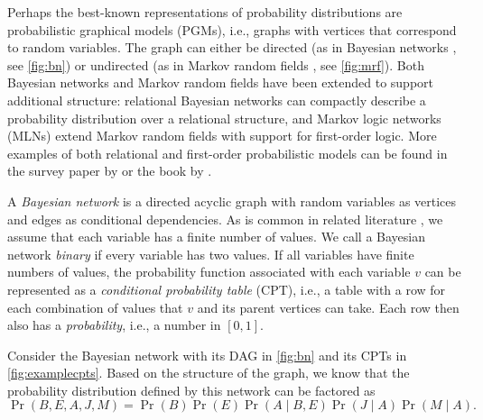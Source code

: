 Perhaps the best-known representations of probability distributions are
probabilistic graphical models (PGMs), i.e., graphs with vertices that
correspond to random variables. The graph can either be directed (as in Bayesian
networks \citep{DBLP:books/daglib/0066829}, see \cref{fig:bn}) or undirected (as
in Markov random fields \citep{spitzer1971markov}, see \cref{fig:mrf}). Both
Bayesian networks and Markov random fields have been extended to support
additional structure: relational Bayesian networks \citep{DBLP:conf/uai/Jaeger97}
can compactly describe a probability distribution over a relational structure,
and Markov logic networks (MLNs) \citep{DBLP:journals/ml/RichardsonD06} extend
Markov random fields with support for first-order logic. More examples of both
relational and first-order probabilistic models can be found in the survey paper
by \citet{DBLP:series/sci/BrazAR08} or the book by \citet{DBLP:series/synthesis/2016Raedt}.

A \emph{Bayesian network} is a directed acyclic graph with random variables as
vertices and edges as conditional dependencies. As is common in related
literature
\citep{DBLP:conf/kr/Darwiche02,DBLP:conf/aaai/SangBK05}, we assume that each
variable has a finite number of values. We call a Bayesian network \emph{binary}
if every variable has two values. If all variables have finite numbers of
values, the probability function associated with each variable $v$ can be
represented as a \emph{conditional probability table} (CPT), i.e., a table
with a row for each combination of values that $v$ and its parent vertices can
take. Each row then also has a \emph{probability}, i.e., a number in $[0, 1]$.

\begin{example} \label{example:bn}
  Consider the Bayesian network with its DAG in \cref{fig:bn} and its CPTs in \cref{fig:examplecpts}. Based on the structure of the graph, we know that the probability distribution defined by this network can be factored as
  \[
  \Pr(B, E, A, J, M) = \Pr(B)\Pr(E)\Pr(A \mid B, E)\Pr(J \mid A)\Pr(M \mid A).
  \]
\end{example}

